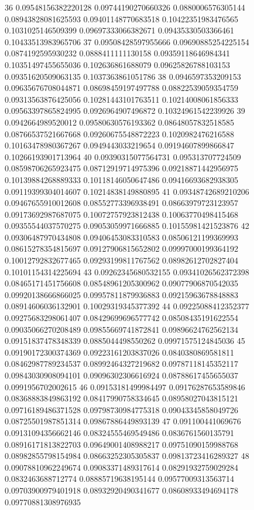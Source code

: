 36 0.09548156382220128 0.09744190270660326 0.0880006576305144 0.08943828081625593 0.09401148770683518 0.10422351983476565 0.1031025146509399 0.09697333066382671 0.09435330503366461 0.10433513983965706
37 0.09508428597955666 0.09690885254225154 0.0874192595930232 0.0888411111130158 0.09359118646984341 0.10351497455655036 0.102636861688079 0.09625826788103153 0.09351620509063135 0.1037363861051786
38 0.0946597353209153 0.09635676708044871 0.08698459197497788 0.08822539059354759 0.09313563876425056 0.10281443101763511 0.10214008061856333 0.09563397865824995 0.0926964907496872 0.10324961542239926
39 0.0942664989520012 0.09580630576193362 0.08648057832518585 0.08766537521667668 0.09260675548872223 0.1020982476216588 0.10163478980367267 0.0949443033219654 0.09194607899866847 0.10266193901713964
40 0.09390315077564731 0.095313707724509 0.08598706265923475 0.08712919714975396 0.09218871442956975 0.10139884268889333 0.10118146050647486 0.09416693682938305 0.09119399304014607 0.10214838149880895
41 0.09348742689210206 0.09467655910012608 0.08552773396938491 0.08663979723123957 0.09173692987687075 0.10072757923812438 0.10063770498415468 0.09355544037570275 0.09053059971666885 0.10155981421523876
42 0.09306487970434808 0.09406453083310583 0.08506121199369993 0.08615278354815697 0.09127906815652802 0.09997000199364192 0.10012792832677465 0.09293199811767562 0.08982612702827404 0.10101154314225694
43 0.09262345680532155 0.09341026562372398 0.08465171451756608 0.08548961205300962 0.09077906870542035 0.09920138666866025 0.09957811879936883 0.09215963678848883 0.08914606036132901 0.10029319345377392
44 0.09225088412352377 0.09275683298061407 0.08429699696577742 0.08508435191622554 0.09035066270208489 0.09855669741872841 0.09896624762562134 0.09151837478348339 0.0885044498550262 0.09971575124845036
45 0.09190172300374369 0.09223161203837026 0.0840380869581811 0.08462987789234537 0.08992464327219682 0.09787118145352117 0.09843030908094101 0.09096302306616924 0.08788617455655037 0.0991956702002615
46 0.09153181499984497 0.09176287653589846 0.08368883849863192 0.08417990758334645 0.08958027043815121 0.09716189486371528 0.09798730984775318 0.09043345858049726 0.08725501987851314 0.09867886449893139
47 0.091100441069676 0.09131094356662146 0.08324555469549486 0.0836761560135791 0.08916171813822703 0.09649001408988217 0.09751090159988768 0.08982855798154984 0.08663252305305837 0.09813723416289327
48 0.09078810962249674 0.09083371489317614 0.08291932759029284 0.0832463688712774 0.08885719638195144 0.09577009313563714 0.09703900979401918 0.08932920490341677 0.08608933494694178 0.09770881308976935
